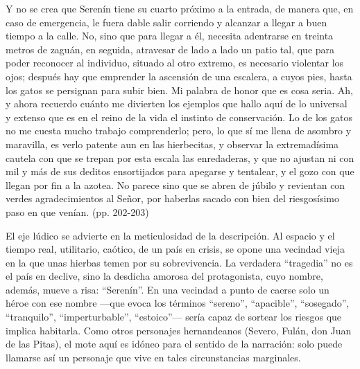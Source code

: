 \documentclass[14pt,twoside,final]{extbook} %
\begin{document}
\begin{quoting}
Y no se crea que Serenín tiene su cuarto próximo a la entrada, de manera que, en caso de emergencia, le fuera dable salir corriendo y alcanzar a llegar a buen tiempo a la calle. No, sino que para llegar a él, necesita adentrarse en treinta metros de zaguán, en seguida, atravesar de lado a lado un patio tal, que para poder reconocer al individuo, situado al otro extremo, es necesario violentar los ojos; después hay que emprender la ascensión de una escalera, a cuyos pies, hasta los gatos se persignan para subir bien. Mi palabra de honor que es cosa seria. Ah, y ahora recuerdo cuánto me divierten los ejemplos que hallo aquí de lo universal y extenso que es en el reino de la vida el instinto de conservación. Lo de los gatos no me cuesta mucho trabajo comprenderlo; pero, lo que sí me llena de asombro y maravilla, es verlo patente aun en las hierbecitas, y observar la extremadísima cautela con que se trepan por esta escala las enredaderas, y que no ajustan ni con mil y más de sus deditos ensortijados para apegarse y tentalear, y el gozo con que llegan por fin a la azotea. No parece sino que se abren de júbilo y revientan con verdes agradecimientos al Señor, por haberlas sacado con bien del riesgosísimo paso en que venían. (pp. 202-203)
\end{quoting}
El eje lúdico se advierte en la meticulosidad de la descripción. Al espacio y el tiempo real, utilitario, caótico, de un país en crisis, se opone una vecindad vieja en la que unas hierbas temen por su sobrevivencia. La verdadera ``tragedia'' no es el país en declive, sino la desdicha amorosa del protagonista, cuyo nombre, además, mueve a risa: ``Serenín''. En una vecindad a punto de caerse solo un héroe con ese nombre ---que evoca los términos ``sereno'', ``apacible'', ``sosegado'', ``tranquilo'', ``imperturbable'', ``estoico''--- sería capaz de sortear los riesgos que implica habitarla. Como otros personajes hernandeanos (Severo, Fulán, don Juan de las Pitas), el mote aquí es idóneo para el sentido de la narración: solo puede llamarse así un personaje que vive en tales circunstancias marginales.
\end{document}
